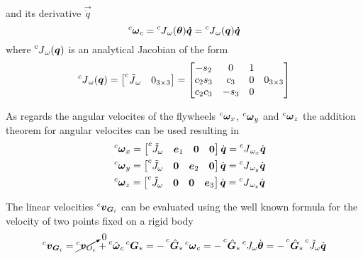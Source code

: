 and its derivative $\vec{\dot{q}}$
\[
\prescript{c}{}{\vec{\omega}}_c = \prescript{c}{}{J}_{\omega} (\vec{\theta}) \vec{\dot{q}}
= \prescript{c}{}{J}_{\omega} (\vec{q}) \vec{\dot{q}}
\]
where $\prescript{c}{}{J}_{\omega}(\vec{q})$ is an analytical Jacobian of the form
\begin{equation}\label{eq:ang_cf}
  \prescript{c}{}{J}_{\omega} (\vec{q}) =
  \begin{bmatrix}
    \prescript{c}{}{\tilde{J}}_{\omega} & 0_{3\times3}
  \end{bmatrix} =
  \begin{bmatrix}
    -s_2 & 0 & 1 &\\
    c_2 s_3 & c_3 & 0 & 0_{3\times3}\\
    c_2 c_3 & -s_3 & 0 &
  \end{bmatrix}
\end{equation}
\par
As regards the angular velocites of the flywheels $\prescript{c}{}{\vec{\omega}}_x$,
$\prescript{c}{}{\vec{\omega}}_y$ and $\prescript{c}{}{\vec{\omega}}_z$ the addition theorem
for angular velocites can be used resulting in
\begin{equation}\label{eq:ang_fw}
  \begin{split}
    & \quad \prescript{c}{}{\vec{\omega}}_x = 
    \begin{bmatrix}
      \prescript{c}{}{\tilde{J}_{\omega}} & \vec{e}_1 & \vec{0} & \vec{0}
    \end{bmatrix} \dot{\vec{q}} = \prescript{c}{}{J}_{\omega_{x}} \dot{\vec{q}}\\
    & \quad \prescript{c}{}{\vec{\omega}}_y = 
    \begin{bmatrix}
      \prescript{c}{}{\tilde{J}_{\omega}} & \vec{0} & \vec{e}_2 & \vec{0}
    \end{bmatrix} \dot{\vec{q}} = \prescript{c}{}{J}_{\omega_{y}} \dot{\vec{q}}\\
    & \quad \prescript{c}{}{\vec{\omega}}_z = 
    \begin{bmatrix}
      \prescript{c}{}{\tilde{J}_{\omega}} & \vec{0} & \vec{0} & \vec{e}_3
    \end{bmatrix} \dot{\vec{q}} = \prescript{c}{}{J}_{\omega_{z}} \dot{\vec{q}}
  \end{split}
\end{equation}
\par
The linear velocities $\prescript{c}{}{\vec{v}}_{\vec{G}_{i}}$ can be evaluated using
the well known formula for the velocity of two points fixed on a rigid body
\[
\prescript{c}{}{\vec{v}}_{\vec{G}_{i}} =
\cancelto{0}{\prescript{c}{}{\vec{v}}_{O_{c}}} + \prescript{c}{}{\unitvec{\omega}}_c \prescript{c}{}{\vec{G}}_*
= -\prescript{c}{}{\unitvec{G}}_* \prescript{c}{}{\vec{\omega}}_c
= -\prescript{c}{}{\unitvec{G}}_* \prescript{c}{}{J_{\omega}} \dot{\vec{\theta}}
= -\prescript{c}{}{\unitvec{G}}_* \prescript{c}{}{\tilde{J}_{\omega}} \dot{\vec{q}}
\]
